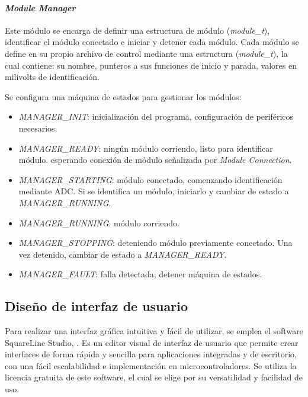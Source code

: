 \paragraph{\textit{Module Manager}}

Este módulo se encarga de definir una estructura de módulo (\textit{module\_t}), identificar el módulo conectado e iniciar y detener cada módulo. Cada módulo se define en su propio archivo de control mediante una estructura (\textit{module\_t}), la cual contiene: su nombre, punteros a sus funciones de inicio y parada, valores en milivolts de identificación.

Se configura una máquina de estados para gestionar los módulos: 

\begin{itemize}[noitemsep]
    \item \textit{MANAGER\_INIT}: inicialización del programa, configuración de periféricos necesarios.
    \item \textit{MANAGER\_READY}: ningún módulo corriendo, listo para identificar módulo. esperando conexión de módulo señalizada por \textit{Module Connection}. 
    \item \textit{MANAGER\_STARTING}: módulo conectado, comenzando identificación mediante ADC. Si se identifica un módulo, iniciarlo y cambiar de estado a \textit{MANAGER\_RUNNING}.
    \item \textit{MANAGER\_RUNNING}: módulo corriendo.
    \item \textit{MANAGER\_STOPPING}: deteniendo módulo previamente conectado. Una vez detenido, cambiar de estado a \textit{MANAGER\_READY}.
    \item \textit{MANAGER\_FAULT}: falla detectada, detener máquina de estados.
\end{itemize}

\subsection{Diseño de interfaz de usuario}

Para realizar una interfaz gráfica intuitiva y fácil de utilizar, se emplea el software SquareLine Studio, \parencite{squareline}. Es un editor visual de interfaz de usuario que permite crear interfaces de forma rápida y sencilla para aplicaciones integradas y de escritorio, con una fácil escalabilidad e implementación en microcontroladores. Se utiliza la licencia gratuita de este software, el cual se elige por su versatilidad y facilidad de uso.

